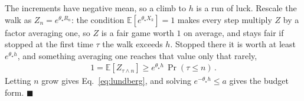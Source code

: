 \documentclass[letterpaper, 10 pt, conference]{ieeeconf}  %
\newcommand{\E}{\mathbb{E}}
\begin{document}
The increments have negative mean, so a climb to $h$ is a run of luck.
Rescale the walk as $Z_n = e^{\theta_{\star} R_n}$: the condition $\E[e^{\theta_{\star} X_k}] = 1$ makes every step multiply $Z$ by a factor averaging one, so $Z$ is a fair game worth $1$ on average, and stays fair if stopped at the first time $\tau$ the walk exceeds $h$.
Stopped there it is worth at least $e^{\theta_{\star} h}$, and something averaging one reaches that value only that rarely,
\begin{align*}
    1 = \E[Z_{\tau \wedge n}] \geq e^{\theta_{\star} h}\,\Pr(\tau \leq n) \,.
\end{align*}
Letting $n$ grow gives Eq.~\ref{eq:lundberg}, and solving $e^{-\theta_{\star} h} \leq a$ gives the budget form. \hfill$\blacksquare$



\end{document}
